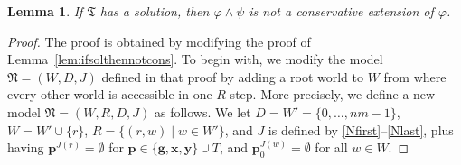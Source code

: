 \documentclass[10pt,a4paper]{amsart}
\theoremstyle{plain}
\newtheorem{lem}[thm]{Lemma}
\theoremstyle{definition}
\newcommand{\tiling}{\mathfrak T}
\newcommand{\tagi}[1]{\textcolor{red}{#1}}
\newcommand{\fform}[1]{\boldsymbol{#1}}
\newcommand{\pvar}{\fform{p}}
\newcommand{\avar}{\fform{a}}
\newcommand{\gvar}{\fform{g}}
\newcommand{\xvar}{\fform{x}}
\newcommand{\yvar}{\fform{y}}
\begin{document}
	
	\begin{lem}\label{lem:ifsolthennotcons2}
		If $\tiling$ has a solution, then $\varphi \wedge \psi$ is not a 
		conservative extension of $\varphi$.
	\end{lem}
	\begin{proof}
		The proof is obtained by modifying the proof of 
		Lemma~\ref{lem:ifsolthennotcons}. 
		To begin with, we modify the model $\mathfrak{N}=(W,D,J)$ defined in that proof by 
		adding a root world to $W$ from where every other world is accessible in one $R$-step.
		More precisely, we define a new model $\mathfrak{N}=(W,R,D,J)$ as follows.
		We let $D=W'=\{0,\dots,nm-1\}$, $W=W'\cup \{r\}$, $R=\{(r,w)\mid w\in W'\}$, and $J$ is defined
		by \eqref{Nfirst}--\eqref{Nlast}, plus having $\pvar^{J(r)}=\emptyset$ for 
		$\pvar\in\{\gvar,\xvar,\yvar\}\cup T$, and $\pvar_0^{J(w)}=\emptyset$ for all $w\in W$.
		

\end{proof}
\end{document}
